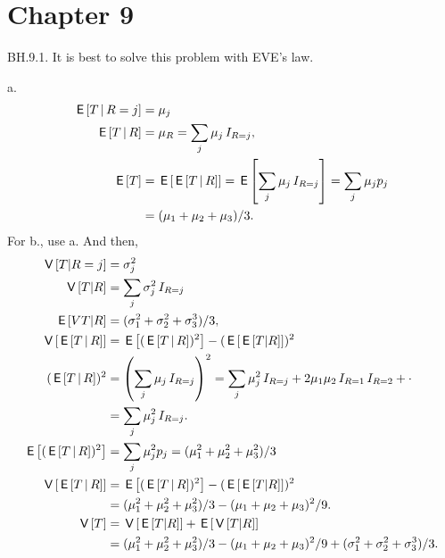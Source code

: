 



\chapter{Chapter 9}



\setcounter{theorem}{0}
\begin{exercise}
BH.9.1. It is best to solve this problem with EVE's law.
\begin{solution}
a.
\begin{align*}
\E{T\given R=j} &= \mu_{j} \\
\E{T\given R} &= \mu_{R} = \sum_j \mu_j \1{R=j},\\
\E{T} &= \E{\E{T\given R}} = \E{\sum_j \mu_{j}\1{R=j}} = \sum_j\mu_{j}p_{j} \\
&=(\mu_{1}+\mu_2+\mu_3)/3.
\end{align*}
For b., use a. And then,
\begin{align*}
\V{T|R=j} &= \sigma_j^2 \\
\V{T|R} &= \sum_j\sigma_j^2\1{R=j} \\
\E{V{T|R}} &= (\sigma_1^2+\sigma_2^2+\sigma_3^3)/3,\\
\V{\E{T\given R}}
&= \E{(\E{T\given R})^{2}}  - (\E{\E{T|R}})^2 \\
(\E{T\given R})^{2}
&= \left(\sum_j \mu_j \1{R=j}\right)^{2}
= \sum_j \mu_j^{2} \1{R=j} + 2\mu_1 \mu_2\1{R=1}\1{R=2} + \cdot\\
&= \sum_j \mu_j^{2} \1{R=j}.\\
\E{(\E{T\given R})^{2}} &= \sum_j\mu_j^{2}p_j= (\mu_1^2+\mu_2^2+\mu_{3}^2)/3\\
\V{\E{T\given R}}
&= \E{(\E{T\given R})^{2}}  - (\E{\E{T|R}})^2 \\
&=(\mu_1^2+\mu_2^2+\mu_{3}^2)/3 - (\mu_1+\mu_2+\mu_3)^2/9.  \\
\V T
 &= \V{\E{T|R}} + \E{\V{T|R}} \\
&=(\mu_1^2+\mu_2^2+\mu_{3}^2)/3 - (\mu_1+\mu_2+\mu_3)^2/9 + (\sigma_1^2+\sigma_2^2+\sigma_3^3)/3.
 \end{align*}
\end{solution}
\end{exercise}

\setcounter{theorem}{24}

